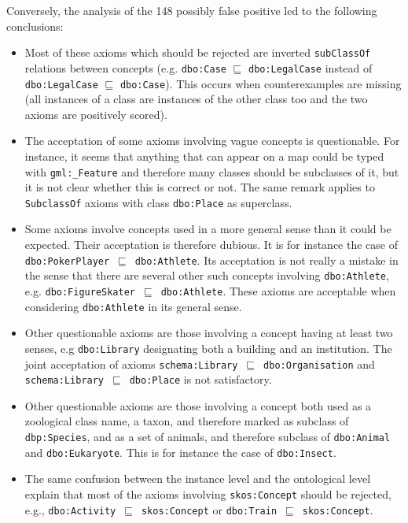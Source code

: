 \documentclass[conference]{IEEEtran}
\begin{document}
Conversely, the analysis of the 148 possibly false positive led to the following conclusions:
\begin{itemize}
\item Most of these axioms which should be rejected are inverted \texttt{subClassOf} relations between concepts (e.g. \texttt{dbo:Case} $\sqsubseteq$ \texttt{dbo:LegalCase} instead of \texttt{dbo:LegalCase} $\sqsubseteq$ \texttt{dbo:Case}). This occurs when counterexamples are missing (all instances of a class are instances of the other class too and the two axioms are positively scored).

\item The acceptation of some axioms involving vague concepts is questionable. For instance, it seems that anything that can appear on a map could be typed with \texttt{gml:\_Feature} and therefore many classes should be subclasses of it, but it is not clear whether this is correct or not. The same remark applies to \texttt{SubclassOf} axioms with class \texttt{dbo:Place} as superclass.

\item Some axioms involve concepts used in a more general sense than it could be expected. Their acceptation is therefore dubious. It is for instance the case of \texttt{dbo:PokerPlayer}~$\sqsubseteq$~\texttt{dbo:Athlete}. Its acceptation is not really a mistake in the sense that there are several other such concepts involving \texttt{dbo:Athlete}, e.g. \texttt{dbo:FigureSkater}~$\sqsubseteq$~\texttt{dbo:Athlete}. These axioms are acceptable when considering \texttt{dbo:Athlete} in its general sense.

\item Other questionable axioms are those involving a concept having at least two senses, e.g \texttt{dbo:Library} designating both a building and an institution. The joint acceptation of axioms \texttt{schema:Library}~$\sqsubseteq$~\texttt{dbo:Organisation} and \texttt{schema:Library}~$\sqsubseteq$~\texttt{dbo:Place} is not satisfactory.

\item Other questionable axioms are those involving a concept both used as a zoological class name, a taxon, and therefore marked as subclass of \texttt{dbp:Species}, and as a set of animals, and therefore subclass of \texttt{dbo:Animal} and  \texttt{dbo:Eukaryote}. This is for instance the case of \texttt{dbo:Insect}.

\item The same confusion between the instance level and the ontological level explain that most of the axioms involving \texttt{skos:Concept} should be rejected, e.g., \texttt{dbo:Activity}~$\sqsubseteq$~\texttt{skos:Concept} or \texttt{dbo:Train}~$\sqsubseteq$~\texttt{skos:Concept}.


\end{itemize}
\end{document}
